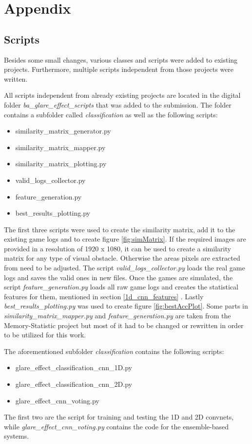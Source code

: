 \appendix

\chapter{Appendix}

\section{Scripts}
Besides some small changes, various classes and scripts were added to existing projects. Furthermore, multiple scripts independent from those projects were written. 

All scripts independent from already existing projects are located in the digital folder \textit{ba\_glare\_effect\_scripts} that was added to the submission. The folder contains a subfolder called \textit{classification} as well as the following scripts: 
\begin{itemize}
	\item similarity\_matrix\_generator.py
	\item similarity\_matrix\_mapper.py
	\item similarity\_matrix\_plotting.py
	\item valid\_logs\_collector.py
	\item feature\_generation.py
	\item best\_results\_plotting.py
\end{itemize}
The first three scripts were used to create the similarity matrix, add it to the existing game logs and to create figure \ref{fig:simMatrix}. If the required images are provided in a resolution of 1920 x 1080, it can be used to create a similarity matrix for any type of visual obstacle. Otherwise the areas pixels are extracted from need to be adjusted. The script \textit{valid\_logs\_collector.py} loads the real game logs and saves the valid ones in new files. Once the games are simulated, the script \textit{feature\_generation.py} loads all raw game logs and creates the statistical features for them, mentioned in section \ref{1d_cnn_features} . Lastly \textit{best\_results\_plotting.py} was used to create figure \ref{fig:bestAccPlot}. Some parts in \textit{similarity\_matrix\_mapper.py} and \textit{feature\_generation.py} are taken from the Memory-Statistic project but most of it had to be changed or rewritten in order to be utilized for this work.

\newpage

The aforementioned subfolder \textit{classification} contains the following scripts: 
\begin{itemize}
	\item glare\_effect\_classification\_cnn\_1D.py
	\item glare\_effect\_classification\_cnn\_2D.py
	\item glare\_effect\_cnn\_voting.py
\end{itemize}
The first two are the script for training and testing the 1D and 2D convnets, while \textit{glare\_effect\_cnn\_voting.py} contains the code for the ensemble-based systems. 

